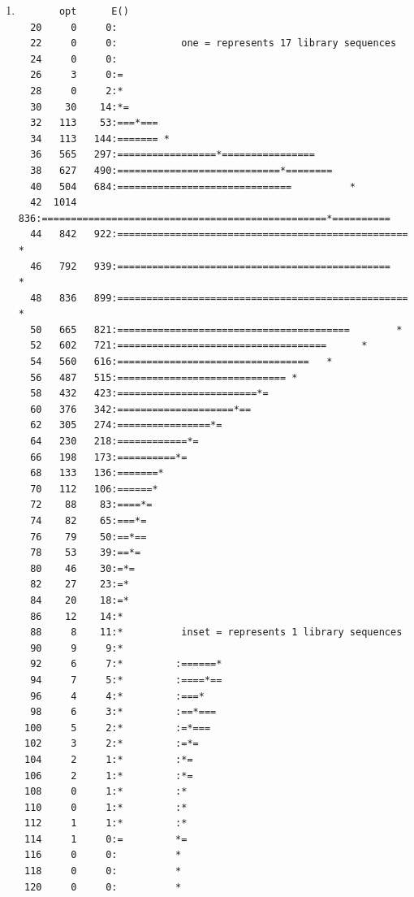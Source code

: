 \documentclass{homework}
\begin{document}
\begin{enumerate}
\begin{enumerate}
\begin{lstlisting}[language=python]
K = 100
f = open('query.fa', 'w')
nukl = ['A','C','G','T']

f.write('> myrandomnukl'+os.linesep)

for i in range(K):
    f.write(random.choice(nukl))
    
f.close()
\end{lstlisting}

\begin{lstlisting}[language=python]
query = open('query.fa', 'r')
db = open('library.fa','r')

query_string = query.readlines()[1][:-1]
count = 0

for line in db:
    if( query_string in line):
        ++count

print (count)

query.close()
db.close()
\end{lstlisting}     

Die Sequenz kommt $0$ mal vor.

\item

\begin{verbatim}
       opt      E()
  20     0     0:
  22     0     0:           one = represents 17 library sequences
  24     0     0:
  26     3     0:=
  28     0     2:*
  30    30    14:*=
  32   113    53:===*===
  34   113   144:======= *
  36   565   297:=================*================
  38   627   490:============================*========
  40   504   684:==============================          *
  42  1014   836:=================================================*==========
  44   842   922:==================================================    *
  46   792   939:===============================================        *
  48   836   899:==================================================  *
  50   665   821:========================================        *
  52   602   721:====================================      *
  54   560   616:=================================   *
  56   487   515:============================= *
  58   432   423:========================*=
  60   376   342:====================*==
  62   305   274:================*=
  64   230   218:============*=
  66   198   173:==========*=
  68   133   136:=======*
  70   112   106:======*
  72    88    83:====*=
  74    82    65:===*=
  76    79    50:==*==
  78    53    39:==*=
  80    46    30:=*=
  82    27    23:=*
  84    20    18:=*
  86    12    14:*
  88     8    11:*          inset = represents 1 library sequences
  90     9     9:*
  92     6     7:*         :======*
  94     7     5:*         :====*==
  96     4     4:*         :===*
  98     6     3:*         :==*===
 100     5     2:*         :=*===
 102     3     2:*         :=*=
 104     2     1:*         :*=
 106     2     1:*         :*=
 108     0     1:*         :*
 110     0     1:*         :*
 112     1     1:*         :*
 114     1     0:=         *=
 116     0     0:          *
 118     0     0:          *
 120     0     0:          *
\end{verbatim} 
 

\end{enumerate}
\end{enumerate}
\end{document}
